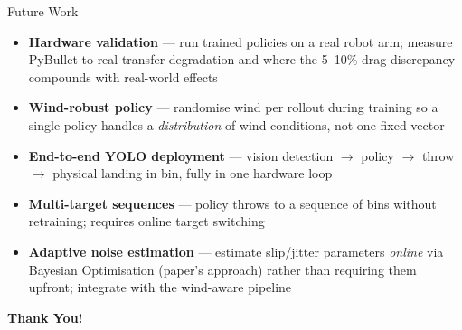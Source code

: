 \documentclass{if-beamer}
\begin{document}
\begin{frame}{Future Work}
    \begin{itemize}
        \item \textbf{Hardware validation} --- run trained policies on a real robot arm; measure PyBullet-to-real transfer degradation and where the 5--10\% drag discrepancy compounds with real-world effects
        \vspace{0.4em}
        \item \textbf{Wind-robust policy} --- randomise wind per rollout during training so a single policy handles a \textit{distribution} of wind conditions, not one fixed vector
        \vspace{0.4em}
        \item \textbf{End-to-end YOLO deployment} --- vision detection $\rightarrow$ policy $\rightarrow$ throw $\rightarrow$ physical landing in bin, fully in one hardware loop
        \vspace{0.4em}
        \item \textbf{Multi-target sequences} --- policy throws to a sequence of bins without retraining; requires online target switching
        \vspace{0.4em}
        \item \textbf{Adaptive noise estimation} --- estimate slip/jitter parameters \textit{online} via Bayesian Optimisation (paper's approach) rather than requiring them upfront; integrate with the wind-aware pipeline
    \end{itemize}
\end{frame}

\begin{frame}[c]
    \centering
    {\Huge \textbf{Thank You!}}\\[1em]
\end{frame}
\end{document}

